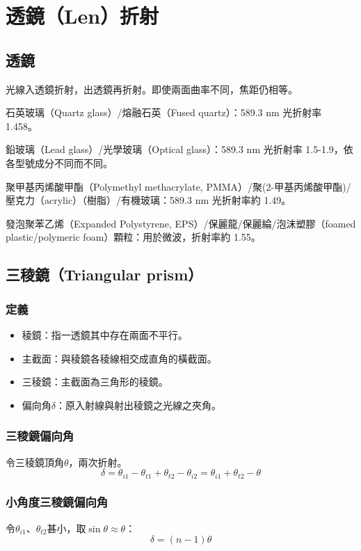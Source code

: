\documentclass[a4paper,12pt]{report}
\begin{document}
\section{透鏡（Len）折射}
\subsection{透鏡}
光線入透鏡折射，出透鏡再折射。即使兩面曲率不同，焦距仍相等。
\bit
\item 石英玻璃（Quartz glass）/熔融石英（Fused quartz）：589.3 nm 光折射率 1.458。
\item 鉛玻璃（Lead glass）/光學玻璃（Optical glass）：589.3 nm 光折射率 1.5-1.9，依各型號成分不同而不同。
\item 聚甲基丙烯酸甲酯（Polymethyl methacrylate, PMMA）/聚(2-甲基丙烯酸甲酯)/壓克力（acrylic）（樹脂）/有機玻璃：589.3 nm 光折射率約 1.49。
\item 發泡聚苯乙烯（Expanded Polystyrene, EPS）/保麗龍/保麗綸/泡沫塑膠（foamed plastic/polymeric foam）顆粒：用於微波，折射率約 1.55。
\eit
\subsection{三稜鏡（Triangular prism）}
\subsubsection{定義}
\begin{itemize}
\item 稜鏡：指一透鏡其中存在兩面不平行。
\item 主截面：與稜鏡各稜線相交成直角的橫截面。
\item 三稜鏡：主截面為三角形的稜鏡。
\item 偏向角$\delta$：原入射線與射出稜鏡之光線之夾角。
\end{itemize}
\subsubsection{三稜鏡偏向角}
令三稜鏡頂角$\theta$，兩次折射。
\[\delta = \theta_{i1}-\theta_{t1}+\theta_{t2}-\theta_{i2}=\theta_{i1}+\theta_{t2}-\theta\]
\subsubsection{小角度三稜鏡偏向角}
令$\theta_{i1}$、$\theta_{t2}$甚小，取$\sin\theta\approx\theta$：
\[\delta=(n-1)\theta\]
\end{document}
